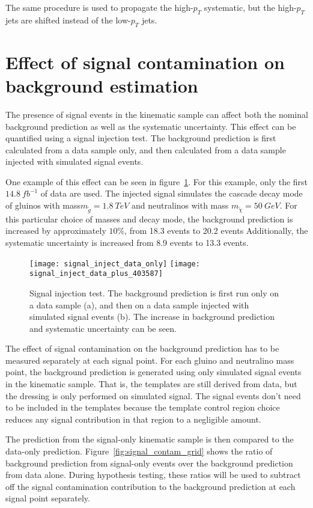The same procedure is used to propagate the high-$p_T$ systematic, but the high-$p_T$ jets are shifted instead of the low-$p_T$ jets.

\section{Effect of signal contamination on background estimation}\label{sec:signal_contamination}
The presence of signal events in the kinematic sample can affect both the nominal background prediction as well as the systematic uncertainty.
This effect can be quantified using a signal injection test.
The background prediction is first calculated from a data sample only, and then calculated from a data sample injected with simulated signal events.

One example of this effect can be seen in figure~\ref{fig:signal_inject_403587}.
For this example, only the first $14.8~fb^{-1}$ of data are used.
The injected signal simulates the cascade decay mode of gluinos with mass$m_{\tilde{g}}=1.8~TeV$ and neutralinos with mass $m_{\tilde{\chi}}=50~GeV$.
For this particular choice of masses and decay mode, the background prediction is increased by approximately $10\%$, from 18.3 events to 20.2 events
Additionally, the systematic uncertainty is increased from 8.9 events to 13.3 events.

\begin{figure}[!ht]
    \texttt{[image: signal\_inject\_data\_only]}
    \texttt{[image: signal\_inject\_data\_plus\_403587]}
    \caption{Signal injection test.
    The background prediction is first run only on a data sample (a), and then on a data sample injected with simulated signal events (b).
    The increase in background prediction and systematic uncertainty can be seen.}
    \label{fig:signal_inject_403587}
\end{figure}

The effect of signal contamination on the background prediction has to be measured separately at each signal point.
For each gluino and neutralino mass point, the background prediction is generated using only simulated signal events in the kinematic sample.
That is, the templates are still derived from data, but the dressing is only performed on simulated signal.
The signal events don't need to be included in the templates because the template control region choice reduces any signal contribution in that region to a negligible amount.

The prediction from the signal-only kinematic sample is then compared to the data-only prediction.
Figure~\ref{fig:signal_contam_grid} shows the ratio of background prediction from signal-only events over the background prediction from data alone.
During hypothesis testing, these ratios will be used to subtract off the signal contamination contribution to the background prediction at each signal point separately.

